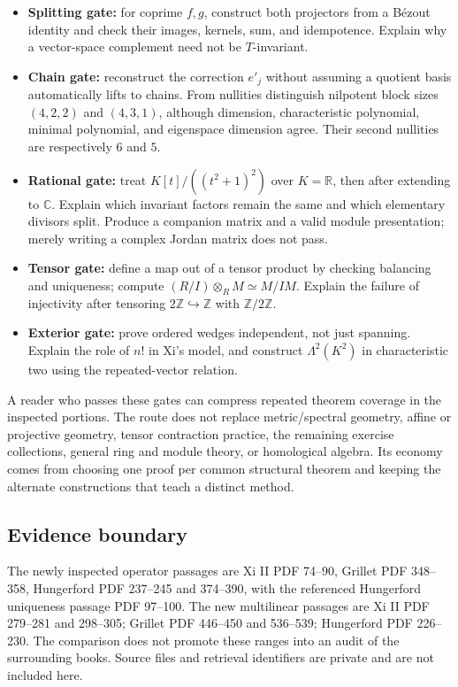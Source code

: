 \documentclass[
  11pt,
]{article}
\providecommand{\tightlist}{%
  \setlength{\itemsep}{0pt}\setlength{\parskip}{0pt}}
\begin{document}
\begin{itemize}
\tightlist
\item
  \textbf{Splitting gate:} for coprime \(f,g\), construct both
  projectors from a Bézout identity and check their images, kernels,
  sum, and idempotence. Explain why a vector-space complement need not
  be \(T\)-invariant.
\item
  \textbf{Chain gate:} reconstruct the correction \(e'_j\) without
  assuming a quotient basis automatically lifts to chains. From
  nullities distinguish nilpotent block sizes \((4,2,2)\) and
  \((4,3,1)\), although dimension, characteristic polynomial, minimal
  polynomial, and eigenspace dimension agree. Their second nullities are
  respectively \(6\) and \(5\).
\item
  \textbf{Rational gate:} treat \(K[t]/((t^2+1)^2)\) over
  \(K=\mathbb R\), then after extending to \(\mathbb C\). Explain which
  invariant factors remain the same and which elementary divisors split.
  Produce a companion matrix and a valid module presentation; merely
  writing a complex Jordan matrix does not pass.
\item
  \textbf{Tensor gate:} define a map out of a tensor product by checking
  balancing and uniqueness; compute \((R/I)\otimes_R M\simeq M/IM\).
  Explain the failure of injectivity after tensoring
  \(2\mathbb Z\hookrightarrow\mathbb Z\) with \(\mathbb Z/2\mathbb Z\).
\item
  \textbf{Exterior gate:} prove ordered wedges independent, not just
  spanning. Explain the role of \(n!\) in Xi's model, and construct
  \(\Lambda^2(K^2)\) in characteristic two using the repeated-vector
  relation.
\end{itemize}

A reader who passes these gates can compress repeated theorem coverage
in the inspected portions. The route does not replace metric/spectral
geometry, affine or projective geometry, tensor contraction practice,
the remaining exercise collections, general ring and module theory, or
homological algebra. Its economy comes from choosing one proof per
common structural theorem and keeping the alternate constructions that
teach a distinct method.

\subsection{Evidence boundary}\label{evidence-boundary}

The newly inspected operator passages are Xi II PDF 74--90, Grillet PDF
348--358, Hungerford PDF 237--245 and 374--390, with the referenced
Hungerford uniqueness passage PDF 97--100. The new multilinear passages
are Xi II PDF 279--281 and 298--305; Grillet PDF 446--450 and 536--539;
Hungerford PDF 226--230. The comparison does not promote these ranges
into an audit of the surrounding books. Source files and retrieval
identifiers are private and are not included here.
\end{document}
